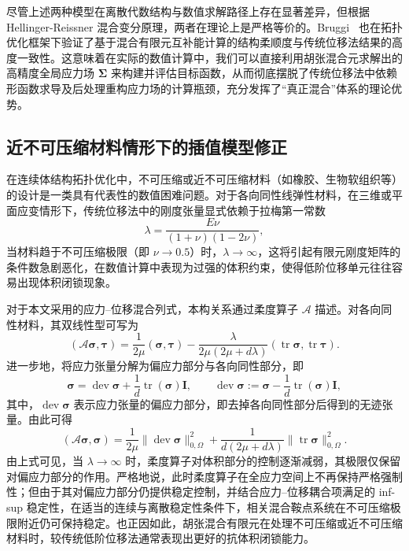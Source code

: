 尽管上述两种模型在离散代数结构与数值求解路径上存在显著差异，但根据 Hellinger-Reissner 混合变分原理，两者在理论上是严格等价的。Bruggi~\cite{bruggiTopologyOptimizationMixed2016a} 也在拓扑优化框架下验证了基于混合有限元互补能计算的结构柔顺度与传统位移法结果的高度一致性。这意味着在实际的数值计算中，我们可以直接利用胡张混合元求解出的高精度全局应力场 $\boldsymbol{\Sigma}$ 来构建并评估目标函数，从而彻底摆脱了传统位移法中依赖形函数求导及后处理重构应力场的计算瓶颈，充分发挥了“真正混合”体系的理论优势。


\subsection{近不可压缩材料情形下的插值模型修正}
\label{subsec:hz_topopt_incompressible_compliance}

在连续体结构拓扑优化中，不可压缩或近不可压缩材料（如橡胶、生物软组织等）的设计是一类具有代表性的数值困难问题。对于各向同性线弹性材料，在三维或平面应变情形下，传统位移法中的刚度张量显式依赖于拉梅第一常数
\[
\lambda=\frac{E\nu}{(1+\nu)(1-2\nu)},
\]
当材料趋于不可压缩极限（即 $\nu\to0.5$）时，$\lambda\to\infty$，这将引起有限元刚度矩阵的条件数急剧恶化，在数值计算中表现为过强的体积约束，使得低阶位移单元往往容易出现体积闭锁现象。

对于本文采用的应力--位移混合列式，本构关系通过柔度算子 $\mathcal A$ 描述。对各向同性材料，其双线性型可写为
\[
(\mathcal A\boldsymbol{\sigma},\boldsymbol{\tau}) =\frac{1}{2\mu}(\boldsymbol{\sigma},\boldsymbol{\tau}) -\frac{\lambda}{2\mu(2\mu+d\lambda)}(\operatorname{tr}\boldsymbol{\sigma},\operatorname{tr}\boldsymbol{\tau}).
\]
进一步地，将应力张量分解为偏应力部分与各向同性部分，即
\[
\boldsymbol{\sigma}=\operatorname{dev}\boldsymbol{\sigma}+\frac{1}{d}\operatorname{tr}(\boldsymbol{\sigma})\boldsymbol{I}, \qquad \operatorname{dev}\boldsymbol{\sigma}:=\boldsymbol{\sigma}-\frac{1}{d}\operatorname{tr}(\boldsymbol{\sigma})\boldsymbol{I},
\]
其中，$\operatorname{dev}\boldsymbol{\sigma}$ 表示应力张量的偏应力部分，即去掉各向同性部分后得到的无迹张量。由此可得
\[
(\mathcal A\boldsymbol{\sigma},\boldsymbol{\sigma}) =\frac{1}{2\mu}\|\operatorname{dev}\boldsymbol{\sigma}\|_{0,\Omega}^2 +\frac{1}{d(2\mu+d\lambda)}\|\operatorname{tr}\boldsymbol{\sigma}\|_{0,\Omega}^2.
\]
由上式可见，当 $\lambda\to\infty$ 时，柔度算子对体积部分的控制逐渐减弱，其极限仅保留对偏应力部分的作用。严格地说，此时柔度算子在全应力空间上不再保持严格强制性；但由于其对偏应力部分仍提供稳定控制，并结合应力--位移耦合项满足的 inf-sup 稳定性，在适当的连续与离散稳定性条件下，相关混合鞍点系统在不可压缩极限附近仍可保持稳定。也正因如此，胡张混合有限元在处理不可压缩或近不可压缩材料时，较传统低阶位移法通常表现出更好的抗体积闭锁能力。

